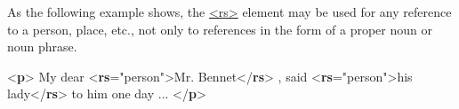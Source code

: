 As the following example shows, the \hyperref[TEI.rs]{<rs>} element may be used for any reference to a person, place, etc., not only to references in the form of a proper noun or noun phrase. \par\bgroup{}\exampleFont \begin{shaded}\noindent\mbox{}{<\textbf{p}>}\mbox{}\newline 
{}My dear {<\textbf{rs}\hspace*{1em}{type}="{person}">}Mr. Bennet{</\textbf{rs}>}\mbox{}\newline 
{}, said\mbox{}\newline 
{<\textbf{rs}\hspace*{1em}{type}="{person}">}his lady{</\textbf{rs}>} to him one day ... \mbox{}\newline 
{</\textbf{p}>}\end{shaded}\egroup\par \par
